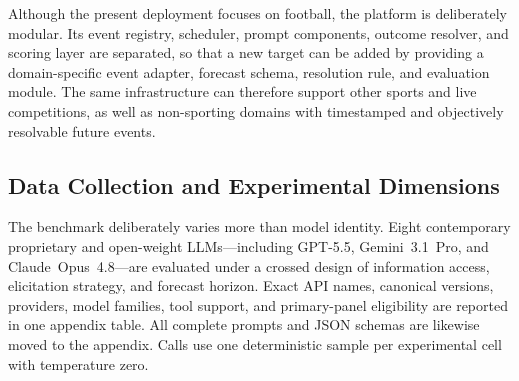 Although the present deployment focuses on football, the platform is deliberately modular. Its event
registry, scheduler, prompt components, outcome resolver, and scoring layer are separated, so that a
new target can be added by providing a domain-specific event adapter, forecast schema, resolution
rule, and evaluation module. The same infrastructure can therefore support other sports and live
competitions, as well as non-sporting domains with timestamped and objectively resolvable future
events.

\subsection{Data Collection and Experimental Dimensions}
\label{sec:data-collection}

The benchmark deliberately varies more than model identity. Eight contemporary proprietary and
open-weight LLMs---including GPT-5.5, Gemini~3.1~Pro, and Claude~Opus~4.8---are evaluated under a
crossed design of information access, elicitation strategy, and forecast horizon. Exact API names,
canonical versions, providers, model families, tool support, and primary-panel eligibility are
reported in one appendix table. All complete prompts and JSON schemas are likewise moved to the
appendix. Calls use one deterministic sample per experimental cell with temperature zero.

